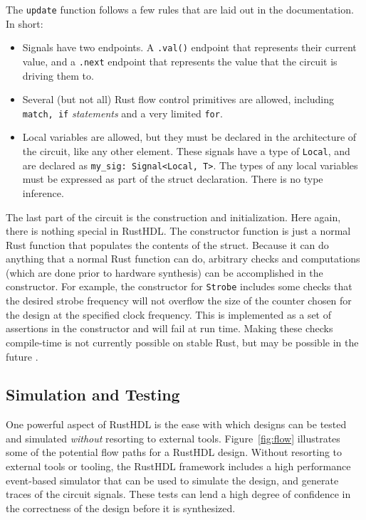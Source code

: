 \documentclass[conference]{IEEEtran}
\begin{document}
The \verb|update| function follows a few rules that are laid out in the documentation.  In short:
\begin{itemize}
  \item Signals have two endpoints.  A \verb|.val()| endpoint that represents their current value, and a \verb|.next| 
    endpoint that represents the value that the circuit is driving them to.
  \item Several (but not all) Rust flow control primitives are allowed, including \verb|match, if| \emph{statements} 
  and a very limited \verb|for|.  
  \item Local variables are allowed, but they must be declared in the architecture of the circuit, like any other element.
  These signals have a type of \verb|Local|, and are declared as \verb|my_sig: Signal<Local, T>|.  The types of any local 
  variables must be expressed as part of the struct declaration.  There is no type inference.
\end{itemize}

The last part of the circuit is the construction and initialization.  Here again, there is nothing special in RustHDL.  The 
constructor function is just a normal Rust function that populates the contents of the struct.  Because it can do anything
that a normal Rust function can do, arbitrary checks and computations (which are done prior to hardware synthesis) can be 
accomplished in the constructor.  For example, the constructor for \verb|Strobe| includes some checks that the 
desired strobe frequency will not overflow the size of the counter chosen for the design at the specified clock frequency.  
This is implemented as a set  of assertions in the constructor and will fail at run time.  Making these checks 
compile-time is not currently possible on stable Rust, but may be possible in the future \cite{b11}.

\subsection{Simulation and Testing}

One powerful aspect of RustHDL is the ease with which designs can be tested and simulated \emph{without} 
resorting to external tools.  Figure~\ref{fig:flow} illustrates some of the potential flow paths for a 
RustHDL design.  Without resorting to external tools or tooling, the RustHDL framework includes a high
performance event-based simulator that can be used to simulate the design, and generate traces of the circuit
signals.  These tests can lend a high degree of confidence in the correctness of the design before it is synthesized.
\end{document}
